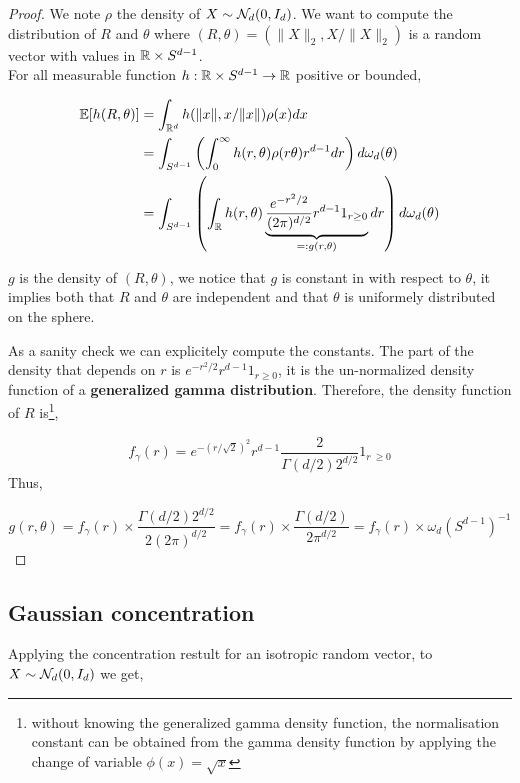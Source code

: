 \documentclass{article}
\begin{document}
\begin{proof}
  We note $\rho$ the density of $X \sim \mathcal{N}_d(0,I_d)$. We want to compute the
  distribution of $R$ and $\theta$ where $(R,\theta) = (\|X\|_2,X/\|X\|_2)$ is a random
  vector with values in $\mathbb{R} \times S^{d-1}$. \\ For all measurable function
  $h:\mathbb{R} \times S^{d-1} \to \mathbb{R}$ positive or bounded, 

\begin{equation}
\begin{aligned}
  \mathbb{E}[h(R,\theta)] &= \int_{\mathbb{R}^{d}} h(\|x\|,x/\|x\|)\rho(x) d x \\  &= \int_{S^{d-1}}\left(\int_{0}^{\infty} h(r,\theta) \rho(r\theta) r^{d-1} d r\right) d \omega_d(\theta) \\
  &= \int_{S^{d-1}}\left(\int_{\mathbb{R}} h(r,\theta) \underbrace{\frac{e^{-r^2/2}}{(2\pi)^{d/2}} r^{d-1}1_{r \geq 0}}_{=: g(r,\theta)} d r\right) d \omega_d(\theta)
\end{aligned}
\end{equation}

$g$ is the density of $(R,\theta)$, we notice that $g$ is constant in with
respect to $\theta$, it implies both that $R$ and $\theta$ are independent and
that $\theta$ is uniformely distributed on the sphere.

As a sanity check we can explicitely compute the constants. The part of
the density that depends on $r$ is $e^{-r^2/2} r^{d-1}1_{r \geq 0}$, it is the un-normalized
density function of a \textbf{generalized gamma distribution}. Therefore, the
density function of $R$ is\footnote{without knowing the generalized gamma density function, the
  normalisation constant can be obtained from the gamma density
  function by applying the change of variable $\phi(x) = \sqrt{x}$},

$$f_{\gamma}(r) = e^{-(r/\sqrt{2})^2} r^{d-1} \frac{2}{\Gamma(d/2)2^{d/2}}1_{r\
  \geq 0}$$
Thus,

$$ g(r,\theta) = f_{\gamma}(r) \times \frac{\Gamma(d/2)2^{d/2}}{2(2\pi)^{d/2}} = f_{\gamma}(r) \times \frac{\Gamma(d/2)}{2\pi^{d/2}} = f_{\gamma}(r) \times \omega_d(S^{d-1})^{-1}$$

\end{proof}

\subsection{Gaussian concentration}

Applying the concentration restult for an isotropic random vector, to $X \sim \mathcal{N}_d(0,I_d)$ we get,
\end{document}
